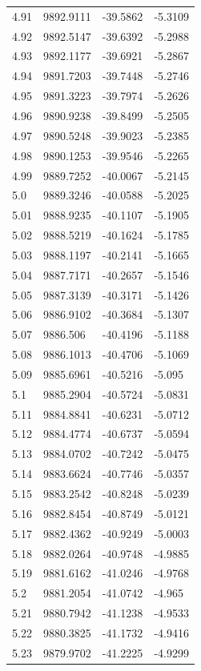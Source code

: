 \begin{table}[H]
\begin{tabular}{llll}
4.91 & 9892.9111 & -39.5862 & -5.3109 \\
4.92 & 9892.5147 & -39.6392 & -5.2988 \\
4.93 & 9892.1177 & -39.6921 & -5.2867 \\
4.94 & 9891.7203 & -39.7448 & -5.2746 \\
4.95 & 9891.3223 & -39.7974 & -5.2626 \\
4.96 & 9890.9238 & -39.8499 & -5.2505 \\
4.97 & 9890.5248 & -39.9023 & -5.2385 \\
4.98 & 9890.1253 & -39.9546 & -5.2265 \\
4.99 & 9889.7252 & -40.0067 & -5.2145 \\
5.0 & 9889.3246 & -40.0588 & -5.2025 \\
5.01 & 9888.9235 & -40.1107 & -5.1905 \\
5.02 & 9888.5219 & -40.1624 & -5.1785 \\
5.03 & 9888.1197 & -40.2141 & -5.1665 \\
5.04 & 9887.7171 & -40.2657 & -5.1546 \\
5.05 & 9887.3139 & -40.3171 & -5.1426 \\
5.06 & 9886.9102 & -40.3684 & -5.1307 \\
5.07 & 9886.506 & -40.4196 & -5.1188 \\
5.08 & 9886.1013 & -40.4706 & -5.1069 \\
5.09 & 9885.6961 & -40.5216 & -5.095 \\
5.1 & 9885.2904 & -40.5724 & -5.0831 \\
5.11 & 9884.8841 & -40.6231 & -5.0712 \\
5.12 & 9884.4774 & -40.6737 & -5.0594 \\
5.13 & 9884.0702 & -40.7242 & -5.0475 \\
5.14 & 9883.6624 & -40.7746 & -5.0357 \\
5.15 & 9883.2542 & -40.8248 & -5.0239 \\
5.16 & 9882.8454 & -40.8749 & -5.0121 \\
5.17 & 9882.4362 & -40.9249 & -5.0003 \\
5.18 & 9882.0264 & -40.9748 & -4.9885 \\
5.19 & 9881.6162 & -41.0246 & -4.9768 \\
5.2 & 9881.2054 & -41.0742 & -4.965 \\
5.21 & 9880.7942 & -41.1238 & -4.9533 \\
5.22 & 9880.3825 & -41.1732 & -4.9416 \\
5.23 & 9879.9702 & -41.2225 & -4.9299 \\

\end{tabular}
\end{table}
